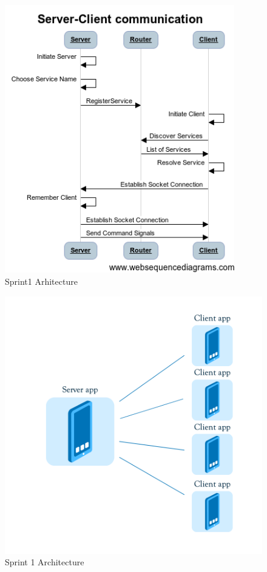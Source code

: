 \begin{figure}[!t]
	\centering
		\includegraphics[width=10cm]{sprint1/Server-Client communication.png}
	\caption{Sprint1 Arhitecture}
	\label{fig:sprint1_arhitecture}
\end{figure}



\begin{figure}[!t]
	\centering
		\includegraphics[width=16cm]{sprint1/arhitecture.png}
	\caption{Sprint 1 Architecture}
	\label{fig:sprint1_arhitecture}
\end{figure}

